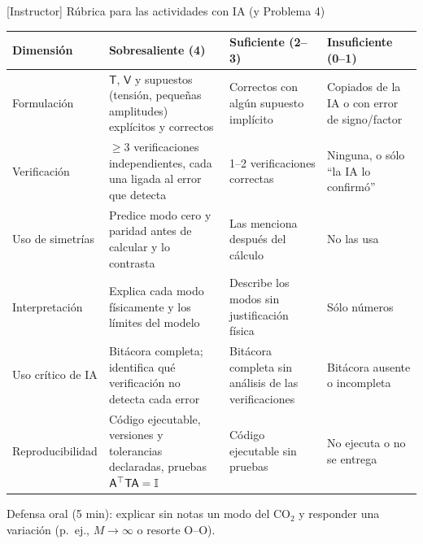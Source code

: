 \documentclass[spanish,10pt]{beamer}
\newcommand{\Tm}{\mathsf{T}}                 %
\newcommand{\Vm}{\mathsf{V}}                 %
\newcommand{\Am}{\mathsf{A}}                 %
\newcommand{\tr}{^{\top}}                    %
\begin{document}
\begin{frame}{[Instructor] Rúbrica para las actividades con IA (y Problema 4)}
\scriptsize
\begin{tabularx}{\textwidth}{@{}>{\raggedright\arraybackslash}p{} X X X@{}}
\toprule
\textbf{Dimensión} & \textbf{Sobresaliente (4)} & \textbf{Suficiente (2–3)} & \textbf{Insuficiente (0–1)} \\
\midrule
Formulación & $\Tm$, $\Vm$ y supuestos (tensión, pequeñas amplitudes) explícitos y correctos & Correctos con algún supuesto implícito & Copiados de la IA o con error de signo/factor \\
Verificación & $\ge3$ verificaciones independientes, cada una ligada al error que detecta & 1–2 verificaciones correctas & Ninguna, o sólo “la IA lo confirmó” \\
Uso de simetrías & Predice modo cero y paridad antes de calcular y lo contrasta & Las menciona después del cálculo & No las usa \\
Interpretación & Explica cada modo físicamente y los límites del modelo & Describe los modos sin justificación física & Sólo números \\
Uso crítico de IA & Bitácora completa; identifica qué verificación no detecta cada error & Bitácora completa sin análisis de las verificaciones & Bitácora ausente o incompleta \\
Reproducibilidad & Código ejecutable, versiones y tolerancias declaradas, pruebas $\Am\tr\Tm\Am=\Id$ & Código ejecutable sin pruebas & No ejecuta o no se entrega \\
\bottomrule
\end{tabularx}
\vspace{0.5ex}
Defensa oral (5 min): explicar sin notas un modo del CO$_2$ y responder una variación (p.~ej., $M\to\infty$ o resorte O--O).
\end{frame}
\fi
\end{document}
